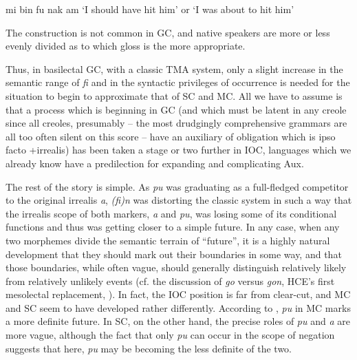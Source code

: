 \ea\label{ex:2:121}
mi bin fu nak am
\glt `I should have hit him' or `I was about to hit him'
\z

The construction is not common in GC, and native speakers are more or less evenly divided as to which gloss is the more appropriate.

Thus, in basilectal GC, with a classic TMA system, only a slight increase in the semantic range of \textit{fi} and in the syntactic privileges of occurrence is needed for the situation to begin to approximate that of SC and MC. All we have to assume is that a process which is beginning in GC (and which must be latent in any creole since all creoles, presumably -- the most drudgingly comprehensive grammars are all too often silent on this score -- have an auxiliary of obligation which is ipso facto +irrealis) has been taken a stage or two further in IOC, languages which we already know have a predilection for expanding and complicating Aux.

The rest of the story is simple. As \textit{pu} was graduating as a full-fledged competitor to the original irrealis \textit{a}, \textit{(fi)n} was distorting the classic system in such a way that the irrealis scope of both markers, \textit{a} and \textit{pu}, was losing some of its conditional functions and thus was getting closer to a simple future. In any case, when any two mor\-phemes divide the semantic terrain of ``future'', it is a highly natural development that they should mark out their boundaries in some way, and that those boundaries, while often vague, should generally dis\-tinguish relatively likely from relatively unlikely events (cf. the discus\-sion of \textit{go} versus \textit{gon}, HCE's first mesolectal replacement, \citealt[23ff., 181ff.]{Bickerton1977}).
In fact, the IOC position is far from clear-cut, and MC and SC seem to have developed rather differently. According to \citet{Corne1977}, \textit{pu} in MC marks a more definite future. In SC, on the other hand, the precise roles of \textit{pu} and \textit{a} are more vague, although the fact that only \textit{pu} can occur in the scope of negation suggests that here, \textit{pu} may be becoming the less definite of the two.\\\\

